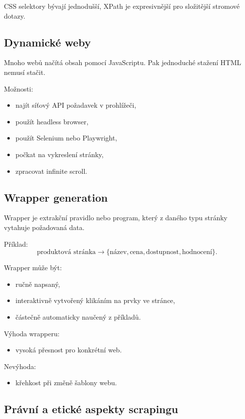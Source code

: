 CSS selektory bývají jednodušší, XPath je expresivnější pro složitější stromové dotazy.

\subsection{Dynamické weby}

Mnoho webů načítá obsah pomocí JavaScriptu. Pak jednoduché stažení HTML nemusí stačit.

Možnosti:
\begin{itemize}
    \item najít síťový API požadavek v prohlížeči,
    \item použít headless browser,
    \item použít Selenium nebo Playwright,
    \item počkat na vykreslení stránky,
    \item zpracovat infinite scroll.
\end{itemize}

\subsection{Wrapper generation}

Wrapper je extrakční pravidlo nebo program, který z daného typu stránky vytahuje požadovaná data.

Příklad:
\[
\text{produktová stránka}
\rightarrow
\{\text{název},\text{cena},\text{dostupnost},\text{hodnocení}\}.
\]

Wrapper může být:
\begin{itemize}
    \item ručně napsaný,
    \item interaktivně vytvořený klikáním na prvky ve stránce,
    \item částečně automaticky naučený z příkladů.
\end{itemize}

Výhoda wrapperu:
\begin{itemize}
    \item vysoká přesnost pro konkrétní web.
\end{itemize}

Nevýhoda:
\begin{itemize}
    \item křehkost při změně šablony webu.
\end{itemize}

\subsection{Právní a etické aspekty scrapingu}

